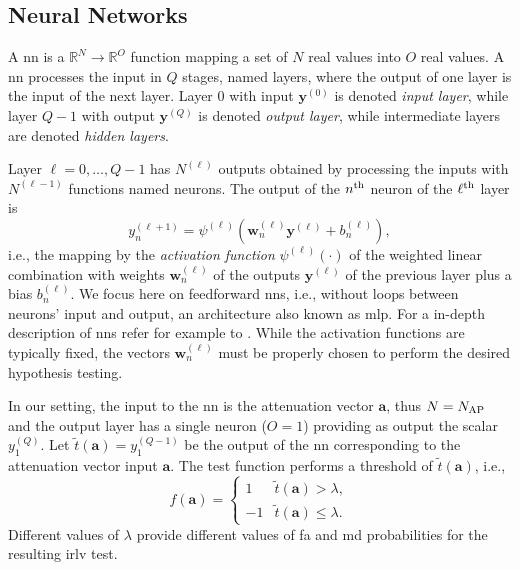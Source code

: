 \documentclass[draftcls,onecolumn,12pt]{IEEEtran}
\begin{document}
\subsection{Neural Networks}\label{sec:nn}

A \ac{nn} is a $\mathbb{R}^N \to \mathbb{R}^O$ function mapping a set of $N$ real values into $O$ real values. A \ac{nn} processes the input in $Q$ stages, named layers, where the output of one layer is the input of the next layer. Layer $0$ with input $\bm{y}^{(0)}$ is denoted {\em input layer}, while layer $Q-1$ with output $\bm{y}^{(Q)}$ is denoted {\em output layer}, while intermediate layers are denoted {\em hidden layers}. 

Layer $\ell=0, \ldots, Q-1$ has $N^{(\ell)}$ outputs obtained by processing the inputs with $N^{(\ell-1)}$ functions named neurons. The output of the $n^{\rm th}$ neuron of the $\ell^{\rm th}$ layer is
\begin{equation}\label{eq:nonLin}
y_n^{(\ell+1)} = \psi^{(\ell)}\left( \bm{w}_n^{(\ell)}\bm{y}^{(\ell)}+b_n^{(\ell)} \right),
\end{equation}
i.e., the mapping by the {\em activation function} $\psi^{(\ell)}(\cdot)$ of the weighted linear combination with weights $\bm{w}_n^{(\ell)}$ of the outputs $\bm{y}^{(\ell)}$ of the previous layer plus a bias $b_n^{(\ell)}$. We focus here on feedforward \acp{nn}, i.e., without loops between neurons' input and output, an architecture  also known as \ac{mlp}. For a in-depth description of \acp{nn} refer for example to \cite{goodfellow}. While the activation functions are typically fixed, the vectors $\bm{w}_n^{(\ell)}$ must be properly chosen to perform the desired hypothesis testing. 

In our setting, the input to the \ac{nn} is the attenuation vector $\bm{a}$, thus $N=N_{\rm AP}$ and the output layer has a single neuron ($O=1$) providing as output the scalar $y^{(Q)}_1$. Let $\tilde{t}(\bm{a}) = y^{(Q-1)}_1$ be the output of the \ac{nn} corresponding to the attenuation vector input $\bm{a}$. The test function performs a threshold of $\tilde{t}(\bm{a})$, i.e.,
\begin{equation}
\label{testfunNN}
    f(\bm{a}) = \begin{cases}
    1 & \tilde{t}(\bm{a}) > \lambda, \\
    -1 & \tilde{t}(\bm{a}) \leq \lambda.
    \end{cases}
\end{equation}
Different values of $\lambda$ provide different values of \ac{fa} and \ac{md} probabilities for the resulting \ac{irlv} test.
   
\end{document}
